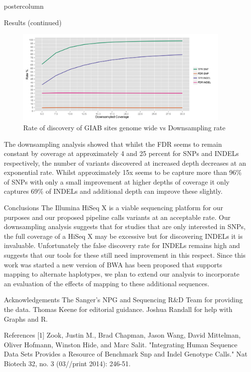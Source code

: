 \documentclass[final]{beamer}
\begin{document}
\begin{frame}{}
\begin{columns}
\begin{column}{.49\textwidth}
\begin{beamercolorbox}[center,wd=\textwidth]{postercolumn}
\begin{minipage}[T]{.95\textwidth}
\begin{block}{Results (continued)}
                \begin{figure}
                \includegraphics[width=0.95\textwidth]{images/downsampling_fig1}
                \caption{Rate of discovery of GIAB sites genome wide vs Downsampling rate}
                \end{figure}

                The downsampling analysis showed that whilst the FDR seems to remain constant by coverage at approximately 4 and 25 percent for SNPs and INDELs respectively, the number of variants discovered at increased depth decreases at an exponential rate.  Whilst approximately 15x seems to be capture more than 96\% of SNPs with only a small improvement at higher depths of coverage it only captures 69\% of INDELs and additional depth can improve these slightly.

            \end{block}
            \begin{block}{Conclusions}
                The Illumina HiSeq X is a viable sequencing platform for our purposes and our proposed pipeline calls variants at an acceptable rate.  Our downsampling analysis suggests that for studies that are only interested in SNPs, the full coverage of a HiSeq X may be excessive but for discovering INDELs it is invaluable. Unfortunately the false discovery rate for INDELs remains high and suggests that our tools for these still need improvement in this respect. Since this work was started a new version of BWA has been proposed that supports mapping to alternate haplotypes, we plan to extend our analysis to incorporate an evaluation of the effects of mapping to these additional sequences.
            \end{block}
            \begin{block}{Acknowledgements}
                The Sanger's NPG and Sequencing R\&D Team for providing the data. Thomas Keene for editorial guidance. Joshua Randall for help with Graphs and R.
            \end{block}
            \begin{block}{References}
                [1] Zook, Justin M., Brad Chapman, Jason Wang, David Mittelman, Oliver Hofmann, Winston Hide, and Marc Salit. "Integrating Human Sequence Data Sets Provides a Resource of Benchmark Snp and Indel Genotype Calls." Nat Biotech 32, no. 3 (03//print 2014): 246-51.
            \end{block}
            \vfill


\end{minipage}
\end{beamercolorbox}
\end{column}
\end{columns}
\end{frame}
\end{document}
